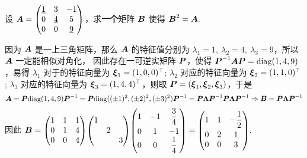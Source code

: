 \begin{example}
    设 $\vb*{A}=\mqty(\underline{1}&3&-1\\0&\underline{4}&5\\0&0&\underline{9})$，求\textbf{一个}矩阵 $\vb*{B}$ 使得 $\vb*{B}^2=\vb*{A}.$
\end{example}
\begin{solution}
    因为 $\vb*{A}$ 是一上三角矩阵，那么 $\vb*{A}$ 的特征值分别为 $\lambda_1=1,~\lambda_2=4,~\lambda_3=9$，所以 $\vb*{A}$ 一定能相似对角化，
    因此存在一可逆实矩阵 $\vb*{P}$，使得 $\vb*{P}^{-1}\vb*{AP}=\mathrm{diag}(1,4,9)$，易得 $\lambda_1$ 对于的特征向量为 $\vb*{\xi}_1=(1,0,0)^\top$; $\lambda_2$ 对应的特征向量为 $\vb*{\xi}_2=(1,1,0)^\top$;
    $\lambda_3$ 对应的特征向量为 $\vb*{\xi}_3=(1,4,4)^\top$，则取 $\vb*{P}=(\vb*{\xi}_1,\vb*{\xi}_2,\vb*{\xi}_3)$，于是 
    $$\vb*{A}=\vb*{P}\mathrm{diag}(1,4,9)\vb*{P}^{-1}=\vb*{P}\mathrm{diag}((\pm1)^2,(\pm2)^2,(\pm3)^2)\vb*{P}^{-1}=\vb*{P\Lambda P}^{-1}\vb*{P\Lambda P}^{-1}\Rightarrow \vb*{B}=\vb*{P\Lambda P}^{-1}$$
    因此 $\vb*{B}=\mqty(1&1&1\\0&1&4\\0&0&4)\mqty(\dmat{1,2,3})\mqty(1&-1&\dfrac{3}{4}\\[6pt]0&1&-1\\0&0&\dfrac{1}{4})=\mqty(1&1&-\dfrac{1}{2}\\[6pt]0&2&1\\0&0&3).$
\end{solution}

